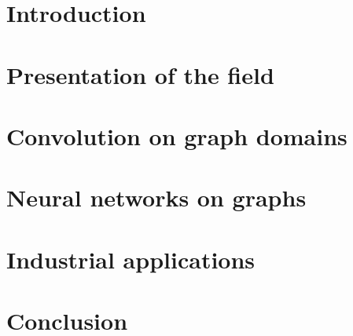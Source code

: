 \documentclass[12pt]{book}
\begin{document}

%
%


%
%

\dominitoc
\tableofcontents

%
%

\chapter*{Introduction}
\label{chp:int}
\todo{}
%

%
%

\chapter{Presentation of the field}

\vfill\minitoc\newpage

\newpage
\newpage
\newpage

%
%
\chapter{Convolution on graph domains}

\vfill\minitoc\newpage

\newpage
\newpage
\newpage
\newpage

%
%

\chapter{Neural networks on graphs}
\vfill\minitoc\newpage

%
%

\chapter{Industrial applications}
\todo{}
\vfill\minitoc\newpage

%
%

\chapter*{Conclusion}
\label{chp:ccl}
\todo{}
\end{document}
